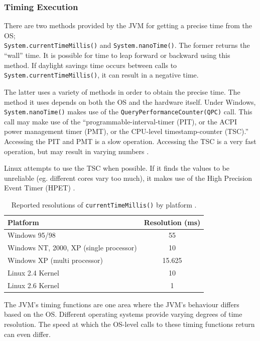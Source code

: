 \documentclass[12pt,letterpaper,oneside,notitlepage]{report}
\theoremstyle{definition}
\begin{document}
				\subsubsection{Timing Execution}
					There are two methods provided by the JVM for getting a precise time from the OS; \\\texttt{System.currentTimeMillis()} and \texttt{System.nanoTime()}.  The former returns the ``wall'' time.  It is possible for time to leap forward or backward using this method.  If daylight savings time occurs between calls to \texttt{System.currentTimeMillis()}, it can result in a negative time.
					
					The latter uses a variety of methods in order to obtain the precise time.  The method it uses depends on both the OS and the hardware itself.  Under Windows, \texttt{System.nanoTime()} makes use of the \texttt{QueryPerformanceCounter(QPC)} call.  This call may make use of the ``programmable-interval-timer (PIT), or the ACPI power management timer (PMT), or the CPU-level timestamp-counter (TSC).'' \cite{hotspot-timer-06}  Accessing the PIT and PMT is a slow operation.  Accessing the TSC is a very fast operation, but may result in varying numbers \cite{linux-tsc-06}.
					
					Linux attempts to use the TSC when possible.  If it finds the values to be unreliable (eg. different cores vary too much), it makes use of the High Precision Event Timer (HPET) \cite{linux-tsc-06}.
					
					\begin{table}[!ht]
						\centering
						\begin{tabular}{lc}
							\toprule
							Platform & Resolution (ms) \\
							\midrule
							Windows 95/98 & 55 \\
							Windows NT, 2000, XP (single processor) & 10 \\
							Windows XP (multi processor) & 15.625 \\
							Linux 2.4 Kernel & 10 \\
							Linux 2.6 Kernel & 1 \\
							\bottomrule
						\end{tabular}
						\caption{Reported resolutions of \texttt{currentTimeMillis()} by platform \cite{rob-java-bench-08}.}
					\end{table}
					
					The JVM's timing functions are one area where the JVM's behaviour differs based on the OS.  Different operating systems provide varying degrees of time resolution.  The speed at which the OS-level calls to these timing functions return can even differ.
				
\end{document}
